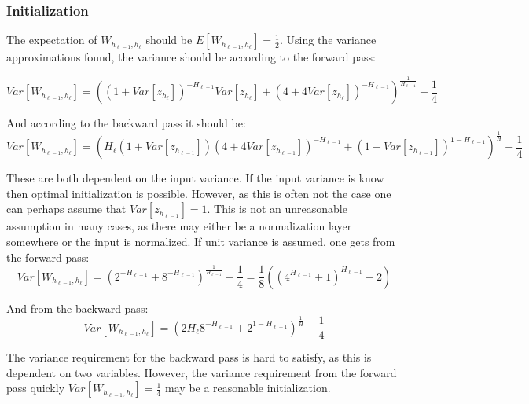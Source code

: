 \subsubsection{Initialization}
\label{sec:appendix:moments:nmu:initialization}

The expectation of $W_{h_{\ell-1},h_\ell}$ should be $E[W_{h_{\ell-1},h_\ell}] = \frac{1}{2}$. Using the variance approximations found, the variance should be according to the forward pass:

\begin{equation}
Var[W_{h_{\ell-1},h_\ell}] = \left((1 + Var[z_{h_\ell}])^{-H_{\ell-1}}Var[z_{h_\ell}] + (4 + 4Var[z_{h_\ell}])^{-H_{\ell-1}}\right)^{\frac{1}{H_{\ell-1}}} - \frac{1}{4}
\end{equation}

And according to the backward pass it should be:
\begin{equation}
Var[W_{h_{\ell-1},h_\ell}] = \left(H_\ell (1 + Var[z_{h_{\ell-1}}]) (4 + 4 Var[z_{h_{\ell-1}}])^{-H_{\ell-1}} + (1 + Var[z_{h_{\ell-1}}])^{1 - H_{\ell-1}}\right)^{\frac{1}{H}} - \frac{1}{4}
\end{equation}

These are both dependent on the input variance. If the input variance is know then optimal initialization is possible. However, as this is often not the case one can perhaps assume that $Var[z_{h_{\ell-1}}] = 1$. This is not an unreasonable assumption in many cases, as there may either be a normalization layer somewhere or the input is normalized. If unit variance is assumed, one gets from the forward pass:
\begin{equation}
Var[W_{h_{\ell-1},h_\ell}] = \left(2^{-H_{\ell-1}} + 8^{-H_{\ell-1}}\right)^{\frac{1}{H_{\ell-1}}} - \frac{1}{4} = \frac{1}{8} \left(\left(4^{H_{\ell-1}} + 1\right)^{H_{\ell-1}} - 2\right)
\end{equation}

And from the backward pass:
\begin{equation}
Var[W_{h_{\ell-1},h_\ell}] = \left(2 H_\ell  8^{-H_{\ell-1}} + 2^{1 - H_{\ell-1}}\right)^{\frac{1}{H}} - \frac{1}{4}
\end{equation}

The variance requirement for the backward pass is hard to satisfy, as this is dependent on two variables. However, the variance requirement from the forward pass quickly $Var[W_{h_{\ell-1},h_\ell}] = \frac{1}{4}$ may be a reasonable initialization.

